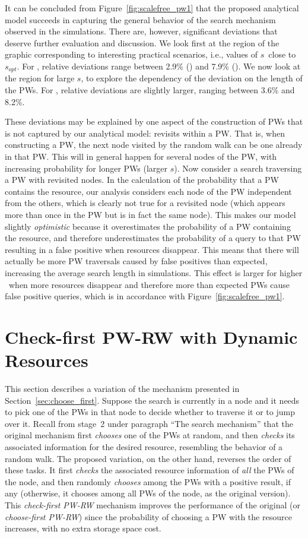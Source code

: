 \documentclass[]{elsarticle}
\newcommand{\s}		{\ensuremath{s}}		\newcommand{\sopt}	{\ensuremath{s_{opt}}}		\newcommand{\p}		{\ensuremath{p}}		\newcommand{\W}		{\ensuremath{W}}		\newcommand{\w}		{\ensuremath{w}}		\newcommand{\lsave}	{\ensuremath{\overline{l}_s}}	\newcommand{\lave}	{\ensuremath{\overline{l}}}	\newcommand{\lopt}	{\ensuremath{\overline{l}_{opt}}}
\begin{document}
It can be concluded from Figure~\ref{fig:scalefree_pw1} that the proposed analytical model succeeds in capturing the general behavior of the search mechanism observed in the simulations. There are, however, significant deviations that deserve further evaluation and discussion. We look first at the region of the graphic corresponding to interesting practical scenarios, i.e., values of \s\ close to \sopt. For , relative deviations range between 2.9\% () and 7.9\% ().
We now look at the region for large \s, to explore the dependency of the deviation on the length of the PWs. For , relative deviations are slightly larger, ranging between 3.6\% and 8.2\%.

These deviations may be explained by one aspect of the construction of PWs that is not captured by our analytical model: revisits within a PW. That is, when constructing a PW, the next node visited by the random walk can be one already in that PW. This will in general happen for several nodes of the PW, with increasing probability for longer PWs (larger \s).
Now consider a search traversing a PW with revisited nodes. In the calculation of the probability that a PW contains the resource, our analysis considers each node of the PW independent from the others, which is clearly not true for a revisited node (which appears more than once in the PW but is in fact the same node). This makes our model slightly \emph{optimistic} because it overestimates the probability of a PW containing the resource, and therefore underestimates the probability of a query to that PW resulting in a false positive when resources disappear. This means that there will actually be more PW traversals caused by false positives than expected, increasing the average search length in simulations. This effect is larger for higher \pd\, when more resources disappear and therefore more than expected PWs cause false positive queries, which is in accordance with Figure~\ref{fig:scalefree_pw1}.


\section{Check-first PW-RW with Dynamic Resources}
\label{sec:check_first}

This section describes a variation of the mechanism presented in Section~\ref{sec:choose_first}. Suppose the search is currently in a node and it needs to pick one of the PWs in that node to decide whether to traverse it or to jump over it. Recall from stage~2 under paragraph ``The search mechanism'' that the original mechanism first \emph{chooses} one of the PWs at random, and then \emph{checks} its associated information for the desired resource, resembling the behavior of a random walk. The proposed variation, on the other hand, reverses the order of these tasks. It first \emph{checks} the associated resource information of \emph{all} the PWs of the node, and then randomly \emph{chooses} among the PWs with a positive result, if any (otherwise, it chooses among all PWs of the node, as the original version). This \emph{check-first PW-RW} mechanism improves the performance of the original (or \emph{choose-first PW-RW}) since the probability of choosing a PW with the resource increases, with no extra storage space cost.
\end{document}
